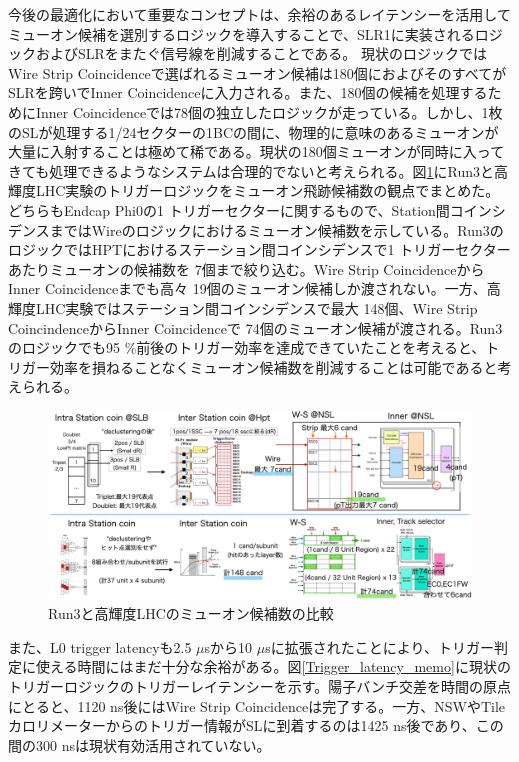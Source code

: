 今後の最適化において重要なコンセプトは、余裕のあるレイテンシーを活用してミューオン候補を選別するロジックを導入することで、SLR1に実装されるロジックおよびSLRをまたぐ信号線を削減することである。
現状のロジックではWire Strip Coincidenceで選ばれるミューオン候補は180個におよびそのすべてがSLRを跨いでInner Coincidenceに入力される。また、180個の候補を処理するためにInner Coincidenceでは78個の独立したロジックが走っている。しかし、1枚のSLが処理する1/24セクターの1BCの間に、物理的に意味のあるミューオンが大量に入射することは極めて稀である。現状の180個ミューオンが同時に入ってきても処理できるようなシステムは合理的でないと考えられる。図\ref{SL_Trigger_Compare}にRun3と高輝度LHC実験のトリガーロジックをミューオン飛跡候補数の観点でまとめた。どちらもEndcap Phi0の1 トリガーセクターに関するもので、Station間コインシデンスまではWireのロジックにおけるミューオン候補数を示している。Run3のロジックではHPTにおけるステーション間コインシデンスで1 トリガーセクターあたりミューオンの候補数を 7個まで絞り込む。Wire Strip CoincidenceからInner Coincidenceまでも高々 19個のミューオン候補しか渡されない。一方、高輝度LHC実験ではステーション間コインシデンスで最大 148個、Wire Strip CoincindenceからInner Coincidenceで 74個のミューオン候補が渡される。Run3のロジックでも95 \%前後のトリガー効率を達成できていたことを考えると、トリガー効率を損ねることなくミューオン候補数を削減することは可能であると考えられる。

\begin{figure} 
\centering
\includegraphics[width=16cm]{fig/SL/Trigger_Compare.png}
\caption[Run3と高輝度LHCのミューオン候補数の比較]{Run3と高輝度LHCのミューオン候補数の比較}
\label{SL_Trigger_Compare}
\end{figure}

また、L0 trigger latencyも2.5 $\mu$sから10 $\mu$sに拡張されたことにより、トリガー判定に使える時間にはまだ十分な余裕がある。図\ref{Trigger_latency_memo}に現状のトリガーロジックのトリガーレイテンシーを示す。陽子バンチ交差を時間の原点にとると、1120 ns後にはWire Strip Coincidenceは完了する。一方、NSWやTile カロリメーターからのトリガー情報がSLに到着するのは1425 ns後であり、この間の300 nsは現状有効活用されていない。

